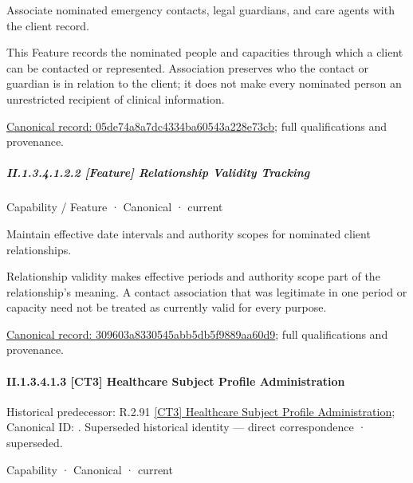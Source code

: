 Associate nominated emergency contacts, legal guardians, and care agents with the client record.



This Feature records the nominated people and capacities through which a client can be contacted or represented. Association preserves who the contact or guardian is in relation to the client; it does not make every nominated person an unrestricted recipient of clinical information.


{\footnotesize \href{../../../../../../../continuum/strategy/capability/feature/05de74a8a7dc4334ba60543a228e73cb.md}{Canonical record: 05de74a8a7dc4334ba60543a228e73cb}; full qualifications and provenance.}\par
\subparagraph*{II.1.3.4.1.2.2 [Feature] Relationship Validity Tracking}
\label{navigation:II.1.3.4.1.2.2}

\label{element:309603a8330545abb5db5f9889aa60d9}
{\small Capability / Feature · Canonical · current}\par

Maintain effective date intervals and authority scopes for nominated client relationships.



Relationship validity makes effective periods and authority scope part of the relationship's meaning. A contact association that was legitimate in one period or capacity need not be treated as currently valid for every purpose.


{\footnotesize \href{../../../../../../../continuum/strategy/capability/feature/309603a8330545abb5db5f9889aa60d9.md}{Canonical record: 309603a8330545abb5db5f9889aa60d9}; full qualifications and provenance.}\par
\paragraph*{II.1.3.4.1.3 [CT3] Healthcare Subject Profile Administration}
\label{navigation:II.1.3.4.1.3}

{\small Historical predecessor: R.2.91 \hyperref[element:d653c3247ddd49479f985f6b435933a0]{[CT3] Healthcare Subject Profile Administration}; Canonical ID: \texttt{}. Superseded historical identity — direct correspondence · superseded.}\par
\label{element:df214b5499694b768eb4a7a175a9d471}
{\small Capability · Canonical · current}\par

